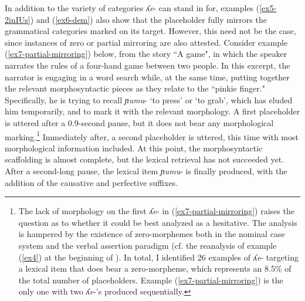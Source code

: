 \documentclass[output=paper,colorlinks,citecolor=brown
\ChapterDOI{10.5281/zenodo.15697581}
]{langscibook}
\begin{document}
In addition to the variety of categories \textit{ʎe}- can stand in for, examples (\ref{ex5-2inIUs}) and (\ref{ex6-dem}) also show that the placeholder fully mirrors the grammatical categories marked on its target. 
However, this need not be the case, since instances of zero or partial mirroring are also attested. 
Consider example (\ref{ex7-partial-mirroring}) below, from the story ``A game", in which the speaker narrates the rules of a four-hand game between two people. 
In this excerpt, the narrator is engaging in a word search while, at the same time, putting together the relevant morphosyntactic pieces as they relate to the ``pinkie finger." 
Specifically, he is trying to recall \textit{ɲumu}- `to press' or `to grab', which has eluded him temporarily, and to mark it with the relevant morphology. 
A first placeholder is uttered after a 0.9-second pause, but it does not bear any morphological marking.\footnote{The lack of morphology on the first \textit{ʎe}- in (\ref{ex7-partial-mirroring}) raises the question as to whether it could be best analyzed as a hesitative. The analysis is hampered by the existence of zero-morphemes both in the nominal case system and the verbal assertion paradigm (cf. the reanalysis of example (\ref{ex4}) at the beginning of ). In total, I identified 26 examples of \textit{ʎe}- targeting a lexical item that does bear a zero-morpheme, which represents an 8.5\% of the total number of placeholders. Example (\ref{ex7-partial-mirroring}) is the only one with two \textit{ʎe}-'s produced sequentially.}
Immediately after, a second placeholder is uttered, this time with most morphological information included. 
At this point, the morphosyntactic scaffolding is almost complete, but the lexical retrieval has not succeeded yet. 
After a second-long pause, the lexical item \textit{ɲumu}- is finally produced, with the addition of the causative and perfective suffixes. 
\end{document}

